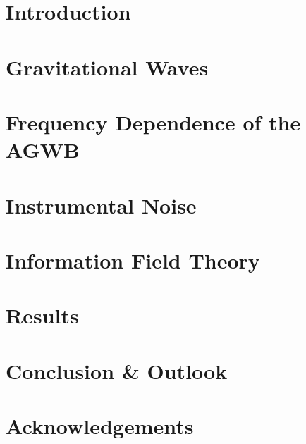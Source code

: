 \documentclass[twoside, 12pt, openany]{book}
\let\chaptername\relax
\begin{document}
\newpage
\begin{spacing}{1}
\tableofcontents
{}
\end{spacing}
\newpage

\pagestyle{fancy}
\renewcommand{\chaptermark}[1]{\markboth{#1}{#1}}
\fancyhead[R]{}
\fancyhead[L]{\MakeUppercase{\chaptername\ \thechapter\ --\ \leftmark} \newline
                \vspace{-0.7cm}
                \noindent\rule{\linewidth}{0.4pt}}
\chapter{Introduction}


\chapter{Gravitational Waves}
\label{gw_chapter}


\chapter{Frequency Dependence of the AGWB}
\label{frequency_chapter}


\chapter{Instrumental Noise}
\label{comp_sep}


\chapter{Information Field Theory}
\label{ift_chapter}


\chapter{Results}
\label{results_chapter}


\chapter{Conclusion \& Outlook}
\label{conclusion_chapter}



\chapter*{Acknowledgements}



\newpage
{}
\printbibliography


\appendix

\end{document}
